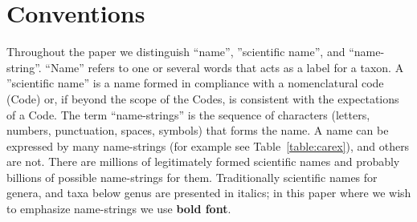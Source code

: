 \documentclass{bmcart}
\begin{document}



\section*{Conventions}

Throughout the paper we distinguish ``name'', ''scientific name'', and
``name-string''.  ``Name'' refers to one or several words that acts as a label
for a taxon. A ''scientific name'' is a name formed in compliance with a
nomenclatural code (Code) or, if beyond the scope of the Codes, is consistent
with the expectations of a Code.  The term ``name-strings'' is the sequence of
characters (letters, numbers, punctuation, spaces, symbols) that forms the
name.  A name can be expressed by many name-strings (for example see
Table~\ref{table:carex}), and others are not.  There are millions of
legitimately formed scientific names and probably billions of possible
name-strings for them. Traditionally scientific names for genera, and taxa
below genus are presented in italics; in this paper where we wish to emphasize
name-strings we use  \textbf{bold font}.
\end{document}
